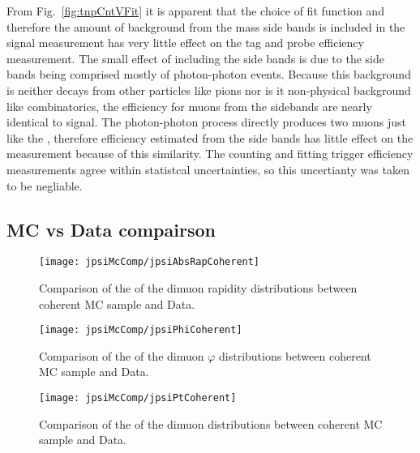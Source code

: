       From Fig.~\ref{fig:tnpCntVFit} it is apparent that the choice of fit 
        function and therefore the amount of background from the mass side 
        bands is included in the signal measurement has very little effect on 
        the tag and probe efficiency measurement.
      The small effect of including the side bands is due to the side bands 
        being comprised mostly of photon-photon events.
      Because this background is neither decays from other particles like pions
        nor is it non-physical background like combinatorics, the efficiency
        for muons from the sidebands are nearly identical to \JPsi{} signal.
      The photon-photon process directly produces two muons just like the 
        \JPsi{}, therefore efficiency estimated from the side bands has 
        little effect on the measurement because of this similarity.
      The counting and fitting trigger efficiency measurements agree within 
        statistcal uncertainties, so this uncertianty was taken to be negliable.

    \subsection{MC vs Data compairson}
      \begin{figure}[h]
        \centering
        \texttt{[image: jpsiMcComp/jpsiAbsRapCoherent]}
        \caption{Comparison of the of the dimuon rapidity distributions between 
          coherent MC sample and Data.}
        \label{fig:jpsiAbsRapCoherent}
      \end{figure}
      \begin{figure}[h]
        \centering
        \texttt{[image: jpsiMcComp/jpsiPhiCoherent]}
        \caption{Comparison of the of the dimuon $\varphi$ distributions 
          between coherent MC sample and Data.}
        \label{fig:jpsiPhiCoherent}
      \end{figure}
      \begin{figure}[h]
        \centering
        \texttt{[image: jpsiMcComp/jpsiPtCoherent]}
        \caption{Comparison of the of the dimuon \pt{} distributions 
          between coherent MC sample and Data.}
        \label{fig:jpsiPtCoherent}
      \end{figure}


